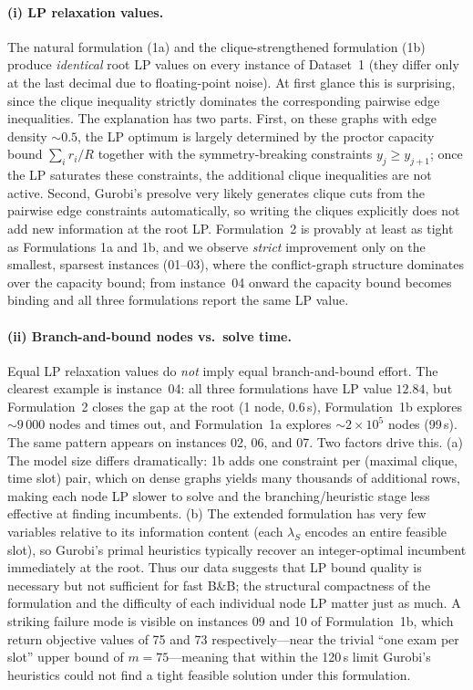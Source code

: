 \documentclass{article}
\begin{document}
\paragraph{(i) LP relaxation values.}
The natural formulation (1a) and the clique-strengthened formulation (1b) produce
\emph{identical} root LP values on every instance of Dataset~1 (they differ only at
the last decimal due to floating-point noise). At first glance this is surprising,
since the clique inequality strictly dominates the corresponding pairwise edge
inequalities. The explanation has two parts. First, on these graphs with edge density
$\sim\!0.5$, the LP optimum is largely determined by the proctor capacity bound
$\sum_i r_i / R$ together with the symmetry-breaking constraints $y_j \geq y_{j+1}$;
once the LP saturates these constraints, the additional clique inequalities are not
active. Second, Gurobi's presolve very likely generates clique cuts from the pairwise
edge constraints automatically, so writing the cliques explicitly does not add new
information at the root LP. Formulation~2 is provably at least as tight as
Formulations 1a and 1b, and we observe \emph{strict} improvement only on the
smallest, sparsest instances (01--03), where the conflict-graph structure dominates
over the capacity bound; from instance~04 onward the capacity bound becomes binding
and all three formulations report the same LP value.

\paragraph{(ii) Branch-and-bound nodes vs.\ solve time.}
Equal LP relaxation values do \emph{not} imply equal branch-and-bound effort. The clearest
example is instance~04: all three formulations have LP value $12.84$, but Formulation~2
closes the gap at the root (1 node, 0.6\,s), Formulation~1b explores
$\sim\!9\,000$ nodes and times out, and Formulation~1a explores
$\sim\!2\!\times\!10^5$ nodes (99\,s). The same pattern appears on instances 02, 06,
and 07. Two factors drive this. (a) The model size differs dramatically: 1b adds one
constraint per (maximal clique, time slot) pair, which on dense graphs yields many
thousands of additional rows, making each node LP slower to solve and the
branching/heuristic stage less effective at finding incumbents. (b) The extended
formulation has very few variables relative to its information content (each
$\lambda_S$ encodes an entire feasible slot), so Gurobi's primal heuristics typically
recover an integer-optimal incumbent immediately at the root. Thus our data suggests
that LP bound quality is necessary but not sufficient for fast B\&B; the structural
compactness of the formulation and the difficulty of each individual node LP matter
just as much. A striking failure mode is visible on instances 09 and 10 of Formulation~1b,
which return objective values of 75 and 73 respectively---near the trivial
``one exam per slot'' upper bound of $m = 75$---meaning that within the 120\,s limit
Gurobi's heuristics could not find a tight feasible solution under this formulation.
\end{document}
